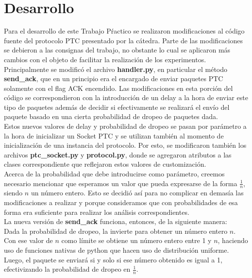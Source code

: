 \section{Desarrollo}

\indent Para el desarrollo de este Trabajo Pŕactico se realizaron modificaciones al código fuente del protocolo PTC presentado por la cátedra. Parte de las modificaciones se debieron a las consignas del trabajo, no obstante lo cual se aplicaron más cambios con el objeto de facilitar la realización de los experimentos.\\

\indent Principalmente se modificó el archivo \textbf{handler.py}, en particular el método \textbf{send\_ack}, que en un principio era el encargado de enviar paquetes PTC solamente con el flag ACK encendido. Las modificaciones en esta porción del código se correspondieron con la introducción de un delay a la hora de enviar este tipo de paquetes además de decidir si efectivamente se realizará el envío del paquete basado en una cierta probabilidad de dropeo de paquetes dada.\\

\indent Estos nuevos  valores de delay y probabilidad de dropeo se pasan por parámetro a la hora de inicializar un Socket PTC y se utilizan también al momento de inicialización de una instancia del protocolo. Por esto, se modificaron también los archivos \textbf{ptc\_socket.py} y \textbf{protocol.py}, donde se agregaron atributos a las clases correspondiente que reflejaron estos valores de customización.\\

\indent Acerca de la probabilidad que debe introducirse como parámetro, creemos necesario mencionar que esperamos un valor que pueda expresarse de la forma $\frac{1}{n}$, siendo $n$ un número entero. Esto se decidió así para no complicar en demasía las modificaciones a realizar y porque consideramos que con probabilidades de esa forma era suficiente para realizar los análisis correspondientes.\\

La nueva versión de \textbf{send\_ack} funciona, entonces, de la siguiente manera:\\
\indent Dada la probabilidad de dropeo, la invierte para obtener un número entero $n$. Con ese valor de $n$ como límite se obtiene un número entero entre 1 y $n$, haciendo uso de funciones nativas de python que hacen uso de distribución uniforme. Luego, el paquete se enviará si y solo si ese número obtenido es igual a 1, efectivizando la probabilidad de dropeo en $\frac{1}{n}$.\\

